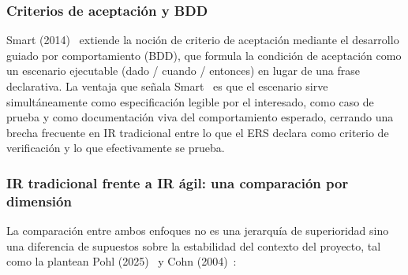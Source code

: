 \documentclass[journal,onecolumn]{IEEEtran}
\begin{document}
	\subsubsection{Criterios de aceptación y BDD}
	
	Smart (2014)~\cite{smart2014} extiende la noción de criterio de
	aceptación mediante el desarrollo guiado por comportamiento (BDD),
	que formula la condición de aceptación como un escenario ejecutable
	(dado / cuando / entonces) en lugar de una frase declarativa. La
	ventaja que señala Smart~\cite{smart2014} es que el escenario
	sirve simultáneamente como especificación legible por el
	interesado, como caso de prueba y como documentación viva del
	comportamiento esperado, cerrando una brecha frecuente en IR
	tradicional entre lo que el ERS declara como criterio de
	verificación y lo que efectivamente se prueba.
	
	\subsubsection{IR tradicional frente a IR ágil: una comparación por dimensión}
	
	La comparación entre ambos enfoques no es una jerarquía de
	superioridad sino una diferencia de supuestos sobre la estabilidad
	del contexto del proyecto, tal como la plantean Pohl
	(2025)~\cite{pohl2025} y Cohn (2004)~\cite{cohn2004}:
	
\end{document}
